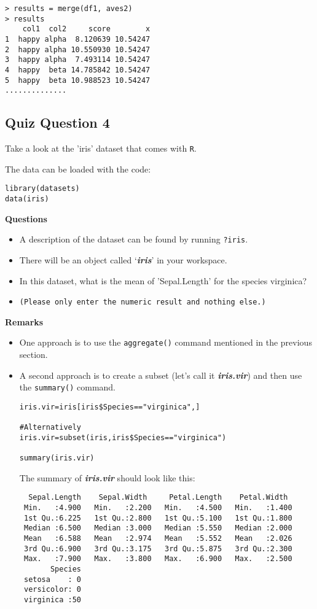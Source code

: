 \documentclass[12pt]{article}
\begin{document}
\begin{verbatim}
> results = merge(df1, aves2) 
> results
    col1  col2     score        x
1  happy alpha  8.120639 10.54247
2  happy alpha 10.550930 10.54247
3  happy alpha  7.493114 10.54247
4  happy  beta 14.785842 10.54247
5  happy  beta 10.988523 10.54247
..............
\end{verbatim}
\newpage
\subsection*{Quiz Question 4}
Take a look at the 'iris' dataset that comes with \texttt{R}. 

The data can be loaded with the code:
\begin{framed}
\begin{verbatim}
library(datasets)
data(iris)
\end{verbatim}
\end{framed}
\noindent \textbf{Questions}
\begin{itemize}
\item A description of the dataset can be found by running \texttt{?iris}.
\item 
There will be an object called `\textit{\textbf{iris}}' in your workspace. 
\item In this dataset, what is the mean of 'Sepal.Length' for the species virginica?
\item \texttt{(Please only enter the numeric result and nothing else.)}
\end{itemize}
\textbf{Remarks}
\begin{itemize}
\item One approach is to use the \texttt{aggregate()} command mentioned in the previous section.
\item A second approach is to create a subset (let's call it \textit{\textbf{iris.vir}}) and then use the \texttt{summary()} command.
\begin{framed}
\begin{verbatim}
iris.vir=iris[iris$Species=="virginica",]

#Alternatively
iris.vir=subset(iris,iris$Species=="virginica")

summary(iris.vir)
\end{verbatim}
\end{framed}
\newpage
The summary of \textit{\textbf{iris.vir}} should look like this:
\begin{verbatim}
  Sepal.Length    Sepal.Width     Petal.Length    Petal.Width   
 Min.   :4.900   Min.   :2.200   Min.   :4.500   Min.   :1.400  
 1st Qu.:6.225   1st Qu.:2.800   1st Qu.:5.100   1st Qu.:1.800  
 Median :6.500   Median :3.000   Median :5.550   Median :2.000  
 Mean   :6.588   Mean   :2.974   Mean   :5.552   Mean   :2.026  
 3rd Qu.:6.900   3rd Qu.:3.175   3rd Qu.:5.875   3rd Qu.:2.300  
 Max.   :7.900   Max.   :3.800   Max.   :6.900   Max.   :2.500  
       Species  
 setosa    : 0  
 versicolor: 0  
 virginica :50  

\end{verbatim}
\end{itemize}
\end{document}
